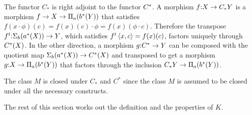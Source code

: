 \documentclass[csh.tex]{subfiles}
\begin{document}
\begin{definition}
The functor $C_*$ is right adjoint to the functor $C^*$. 
A morphism $f\mathord : X\to C_*Y$ is a morphism $f\to X \to \Pi_{a}(b^*(Y))$ that satisfies $f(x\cdot\phi)(c) = f(x)(c)\cdot\phi = f(x)(\phi\cdot c)$. Therefore the transpose $f^t\mathord : \Sigma_{b}(a^*(X)) \to Y$, which satisfies $f^t\left\langle x,c \right\rangle = f(x)(c)$, factors uniquely through $C^*(X)$. In the other direction, a morphism $g\mathord : C^*\to Y$ can be composed with the quotient map $\Sigma_{b}(a^*(X)) \to C^*(X)$ and transposed to get a morphism $g\mathord : X \to \Pi_{a}(b^*(Y))$ that factors through the inclusion $C_*Y\to \Pi_{a}(b^*(Y))$. 
\end{definition}

\begin{remark} 
The class $M$ is closed under $C_*$ and $C^*$ since the class $M$ is assumed to be closed under all the necessary constructs. \end{remark}


The rest of this section works out the definition and the properties of $K$.
\end{document}
